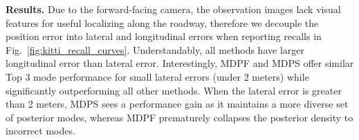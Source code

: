             \textbf{Results.} Due to the forward-facing camera, the observation images lack visual features for useful localizing along the roadway, therefore we decouple the position error into lateral and longitudinal errors when reporting recalls in Fig.~\ref{fig:kitti_recall_curves}. Understandably, all methods have larger longitudinal error than lateral error. Interestingly, MDPF and MDPS offer similar Top 3 mode performance for small lateral errors (under 2 meters) while significantly outperforming all other methods. When the lateral error is greater than 2 meters, MDPS sees a performance gain as it maintains a more diverse set of posterior modes, whereas MDPF prematurely collapses the posterior density to incorrect modes.
            